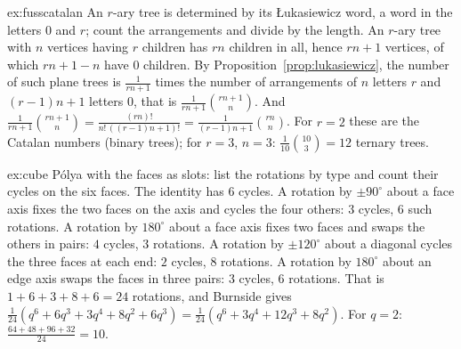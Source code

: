 \begin{solution}{ex:fusscatalan}
\idea An $r$-ary tree is determined by its \L ukasiewicz word, a word in the letters $0$ and $r$; count the arrangements and divide by
the length.
\writeup An $r$-ary tree with $n$ vertices having $r$ children has $rn$ children in all, hence $rn+1$ vertices, of which $rn+1-n$ have $0$ children.
By Proposition~\ref{prop:lukasiewicz}, the number of such plane trees is $\frac1{rn+1}$ times the number of arrangements of $n$ letters $r$ and
$(r-1)n+1$ letters $0$, that is $\frac1{rn+1}\binom{rn+1}n$. And $\frac1{rn+1}\binom{rn+1}n=\frac{(rn)!}{n!\,((r-1)n+1)!}=\frac1{(r-1)n+1}\binom{rn}n$. For $r=2$ these are the Catalan
numbers (binary trees); for $r=3$, $n=3$: $\frac1{10}\binom{10}3=12$ ternary trees.
\end{solution}

\begin{solution}{ex:cube}
\idea P\'olya with the faces as slots: list the rotations by type and count their cycles on the six faces.
\writeup The identity has $6$ cycles. A rotation by $\pm90^\circ$ about a face axis fixes the two faces on the axis and cycles the four others:
$3$ cycles, $6$ such rotations. A rotation by $180^\circ$ about a face axis fixes two faces and swaps the others in pairs: $4$ cycles, $3$
rotations. A rotation by $\pm120^\circ$ about a diagonal cycles the three faces at each end: $2$ cycles, $8$ rotations. A rotation by $180^\circ$
about an edge axis swaps the faces in three pairs: $3$ cycles, $6$ rotations. That is $1+6+3+8+6=24$ rotations, and Burnside gives
$\frac1{24}(q^6+6q^3+3q^4+8q^2+6q^3)=\frac1{24}(q^6+3q^4+12q^3+8q^2)$. For $q=2$: $\frac{64+48+96+32}{24}=10$.
\end{solution}


